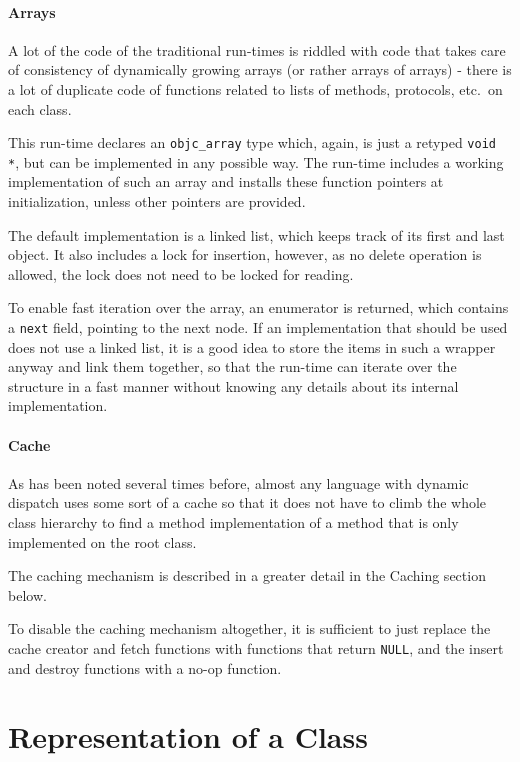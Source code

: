 \paragraph{Arrays}

A lot of the code of the traditional run-times is riddled with code that takes care of consistency of dynamically growing arrays (or rather arrays of arrays) - there is a lot of duplicate code of functions related to lists of methods, protocols, etc.\ on each class.

This run-time declares an \verb=objc_array= type which, again, is just a retyped \verb=void *=, but can be implemented in any possible way. The run-time includes a working implementation of such an array and installs these function pointers at initialization, unless other pointers are provided.

The default implementation is a linked list, which keeps track of its first and last object. It also includes a lock for insertion, however, as no delete operation is allowed, the lock does not need to be locked for reading.

To enable fast iteration over the array, an enumerator is returned, which contains a \verb=next= field, pointing to the next node. If an implementation that should be used does not use a linked list, it is a good idea to store the items in such a wrapper anyway and link them together, so that the run-time can iterate over the structure in a fast manner without knowing any details about its internal implementation.

\paragraph{Cache}

As has been noted several times before, almost any language with dynamic dispatch uses some sort of a cache so that it does not have to climb the whole class hierarchy to find a method implementation of a method that is only implemented on the root class.

The caching mechanism is described in a greater detail in the Caching section below. 

To disable the caching mechanism altogether, it is sufficient to just replace the cache creator and fetch functions with functions that return \verb=NULL=, and the insert and destroy functions with a no-op function.

\section{Representation of a Class}

